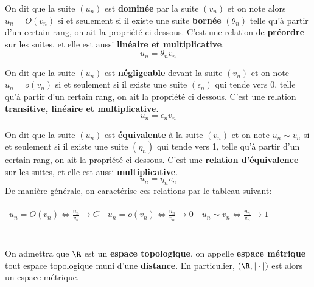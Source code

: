 \subsection*{}

On dit que la suite \((u_n)\) est \textbf{dominée} par la suite \((v_n)\) et on note alors \(u_n = O(v_n)\) si et seulement si il existe une suite \textbf{bornée} \((\theta_n)\) telle qu'à partir d'un certain rang, on ait la propriété ci dessous.\+
C'est une relation de \textbf{préordre} sur les suites, et elle est aussi \textbf{linéaire et multiplicative}.
\[
    u_n = \theta_n v_n
\]

On dit que la suite \((u_n)\) est \textbf{négligeable} devant la suite \((v_n)\) et on note \(u_n = o(v_n)\) si et seulement si il existe une suite \((\epsilon_n)\) qui tende vers 0, telle qu'à partir d'un certain rang, on ait la propriété ci dessous.\+
C'est une relation \textbf{transitive, linéaire et multiplicative}.
\[
    u_n = \epsilon_n v_n
\]

On dit que la suite \((u_n)\) est \textbf{équivalente} à la suite \((v_n)\) et on note \(u_n \sim v_n\) si et seulement si il existe une suite \((\eta_n)\) qui tende vers 1, telle qu'à partir d'un certain rang, on ait la propriété ci-dessous.\+ 
C'est une \textbf{relation d'équivalence} sur les suites, et elle est aussi \textbf{multiplicative}. 
\[
    u_n = \eta_n v_n
\]
De manière générale, on caractérise ces relations par le tableau suivant:
\begin{center}
    \renewcommand{\arraystretch}{1.5}%
    \setlength\arrayrulewidth{0.8pt}
    \begin{tabular}{| c | c | c |}
    \hline
    \(u_n = O(v_n) \Longleftrightarrow \frac{u_n}{v_n} \longrightarrow C\) &    \(u_n = o(v_n) \Longleftrightarrow \frac{u_n}{v_n} \longrightarrow 0\) &    \(u_n \sim v_n \Longleftrightarrow \frac{u_n}{v_n} \longrightarrow 1\)\\ [1.5ex]
    \hline
    \end{tabular}
 \end{center}  

\chapter*{} %

On admettra que \(\R\) est un \textbf{espace topologique}, on appelle \textbf{espace métrique} tout espace topologique muni d'une \textbf{distance}. En particulier, \((\R, |\cdot|)\) est alors un espace métrique.\<

